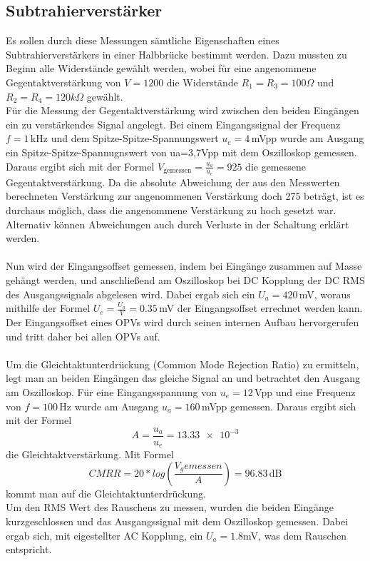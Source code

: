 \subsection{Subtrahierverstärker}
\label{sec:subtrahier}
Es sollen durch diese Messungen sämtliche Eigenschaften eines Subtrahierverstärkers in einer Halbbrücke bestimmt werden. Dazu mussten zu Beginn alle Widerstände gewählt werden, wobei für eine angenommene Gegentaktverstärkung von $V=1200$ die Widerstände $R_1=R_3=100\Omega$ und $R_2=R_4=120k\Omega$ gewählt. \\
Für die Messung der Gegentaktverstärkung wird zwischen den beiden Eingängen ein zu verstärkendes Signal angelegt. Bei einem Eingangssignal der Frequenz $f=1\,$kHz und dem Spitze-Spitze-Spannungswert $u_e=4\,$mVpp wurde am Ausgang ein Spitze-Spitze-Spannugnswert von ua=3,7Vpp mit dem Oszilloskop gemessen. Daraus ergibt sich mit der Formel $V_\text{gemessen}=\frac{u_a}{u_e}=925$ die gemessene Gegentaktverstärkung. Da die absolute Abweichung der aus den Messwerten berechneten Verstärkung zur angenommenen Verstärkung doch 275 beträgt, ist es durchaus möglich, dass die angenommene Verstärkung zu hoch gesetzt war. Alternativ können Abweichungen auch durch Verluste in der Schaltung erklärt werden. \\ \\
Nun wird der Eingangsoffset gemessen, indem bei Eingänge zusammen auf Masse gehängt werden, und anschließend am Oszilloskop bei DC Kopplung der DC RMS des Ausgangssignals abgelesen wird. Dabei ergab sich ein $U_a=420\,$mV, woraus mithilfe der Formel $U_e=\frac{U_a}{V}=0.35\,$mV der Eingangsoffset errechnet werden kann. Der Eingangsoffset eines OPVs wird durch seinen internen Aufbau hervorgerufen und tritt daher bei allen OPVs auf. \\ \\
Um die Gleichtaktunterdrückung (Common Mode Rejection Ratio) zu ermitteln, legt man an beiden Eingängen das gleiche Signal an und betrachtet den Ausgang am Oszilloskop. Für eine Eingangsspannung von $u_e=12\,$Vpp und eine Frequenz von $f=100\,$Hz wurde am Ausgang $u_a=160\,$mVpp gemessen. Daraus ergibt sich mit der Formel
\begin{equation}
	A=\frac{u_a}{u_e}=\num{13.33e-3}
\end{equation}
die Gleichtaktverstärkung. Mit Formel 
\begin{equation}
	CMRR=20*log(\frac{V_gemessen}{A})=96.83\,\text{dB} 
\end{equation}
kommt man auf die Gleichtaktunterdrückung. \\
Um den RMS Wert des Rauschens zu messen, wurden die beiden Eingänge kurzgeschlossen und das Ausgangssignal mit dem Oszilloskop gemessen. Dabei ergab sich, mit eigestellter AC Kopplung, ein $U_a=1.8$mV, was dem Rauschen entspricht.

